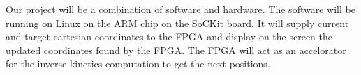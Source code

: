Our project will be a combination of software and hardware. The software will 
be running on Linux on the ARM chip on the SoCKit board. It will supply current and target cartesian coordinates to the FPGA and display on the screen the 
updated coordinates found by the FPGA. The FPGA will act as an accelorator 
for the inverse kinetics computation to get the next positions. 


